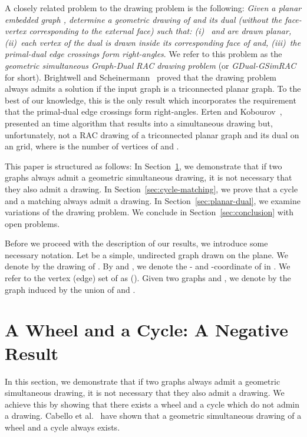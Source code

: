 \documentclass{llncs}
\begin{document}
A closely related problem to the  drawing problem is the
following: \emph{Given a planar embedded graph , determine a
geometric drawing of  and its dual  (without the face-vertex
corresponding to the external face) such that: (i)~ and  are
drawn planar, (ii)~each vertex of the dual is drawn inside its
corresponding face of  and, (iii)~the primal-dual edge crossings
form right-angles}. We refer to this problem as the \emph{geometric
simultaneous Graph-Dual RAC drawing problem} (or
\emph{GDual-GSimRAC} for short). Brightwell and
Scheinermann~\cite{BS93} proved that the  drawing problem
always admits a solution if the input graph is a triconnected planar
graph. To the best of our knowledge, this is the only result which
incorporates the requirement that the primal-dual edge crossings
form right-angles. Erten and Kobourov~\cite{EK05}, presented an
 time algorithm that results into a simultaneous drawing but,
unfortunately, not a RAC drawing of a triconnected planar graph and
its dual on an 
grid, where  is the number of vertices of  and .


This paper is structured as follows: In
Section~\ref{sec:wheel-cycle}, we demonstrate that if two graphs
always admit a geometric simultaneous drawing, it is not necessary
that they also admit a  drawing. In
Section~\ref{sec:cycle-matching}, we prove that a cycle and a
matching always admit a  drawing. In
Section~\ref{sec:planar-dual}, we examine variations of the 
drawing problem. We conclude in Section~\ref{sec:conclusion} with
open problems.

Before we proceed with the description of our results, we introduce
some necessary notation. Let  be a simple, undirected graph
drawn on the plane. We denote by  the drawing of . By
 and , we denote the - and -coordinate of  in . We refer to the vertex (edge) set of  as
 (). Given two graphs  and , we denote by  the graph induced by the union of  and .

\section{A Wheel and a Cycle: A Negative Result}
\label{sec:wheel-cycle}


In this section, we demonstrate that if two graphs always admit a
geometric simultaneous drawing, it is not necessary that they also
admit a  drawing. We achieve this by showing that there
exists a wheel and a cycle which do not admin a  drawing.
Cabello et al.\ \cite{CvKLMSV11} have shown that a geometric
simultaneous drawing of a wheel and a cycle always exists.
\end{document}
